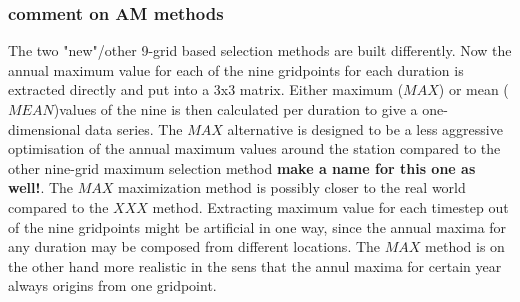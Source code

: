 \subsubsection{comment on AM methods}

The two "new"/other 9-grid based selection methods are built differently. Now the annual maximum value for each of the nine  gridpoints for each duration is extracted directly and put into a 3x3 matrix. Either maximum ($MAX$) or mean ($MEAN$)values of the nine is then calculated per duration to give a one-dimensional data series. The $MAX$ alternative is designed to be a less aggressive optimisation of the annual maximum values around the station compared to the other nine-grid maximum selection method \textbf{make a name for this one as well!}. The  $MAX$ maximization method is possibly closer to the real world compared to the \textbf{$XXX$} method. Extracting maximum value for each timestep out of the nine gridpoints might be artificial in one way, since the annual maxima for any duration may be composed from different locations. The $MAX$ method is on the other hand more realistic in the sens that the annul maxima for certain year always origins from one gridpoint. 
